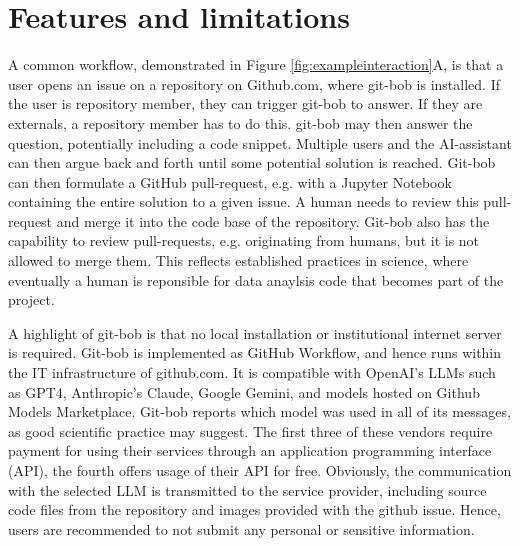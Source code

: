 \documentclass{ecai}
\begin{document}

\section{Features and limitations}

A common workflow, demonstrated in Figure \ref{fig:exampleinteraction}A, is that a user opens an issue on a repository on Github.com, where git-bob is installed. If the user is repository member, they can trigger git-bob to answer. If they are externals, a repository member has to do this. git-bob may then answer the question, potentially including a code snippet. Multiple users and the AI-assistant can then argue back and forth until some potential solution is reached. Git-bob can then formulate a GitHub pull-request, e.g. with a Jupyter Notebook containing the entire solution to a given issue. A human needs to review this pull-request and merge it into the code base of the repository. Git-bob also has the capability to review pull-requests, e.g. originating from humans, but it is not allowed to merge them. This reflects established practices in science, where eventually a human is reponsible for data anaylsis code that becomes part of the project.

A highlight of git-bob is that no local installation or institutional internet server is required. Git-bob is implemented as GitHub Workflow, and hence runs within the IT infrastructure of github.com. It is compatible with OpenAI's LLMs such as GPT4, Anthropic's Claude, Google Gemini, and models hosted on Github Models Marketplace. Git-bob reports which model was used in all of its messages, as good scientific practice may suggest. The first three of these vendors require payment for using their services through an application programming interface (API), the fourth offers usage of their API for free. Obviously, the communication with the selected LLM is transmitted to the service provider, including source code files from the repository and images provided with the github issue. Hence, users are recommended to not submit any personal or sensitive information. 
\end{document}
